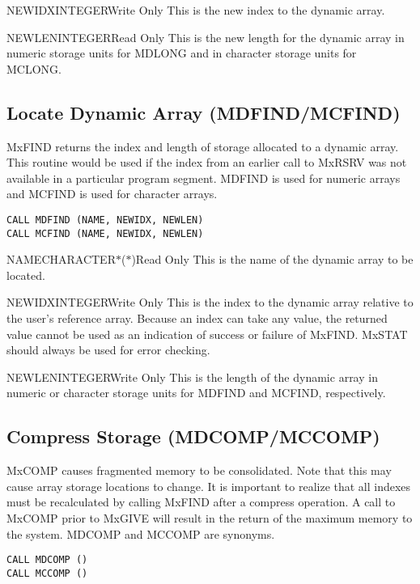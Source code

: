 \begin{argy}{NEWIDX}{INTEGER}{Write Only}
This is the new index to the dynamic array.
\end{argy}

\begin{argy}{NEWLEN}{INTEGER}{Read Only}
This is the new length for the dynamic array in numeric storage units for
MDLONG and in character storage units for MCLONG.
\end{argy}

\subsection{Locate Dynamic Array (MDFIND/MCFIND)}
MxFIND
returns the index and length of storage allocated to a dynamic
array.  This routine would be used if the index from an earlier call to
MxRSRV was not available in a particular program segment. MDFIND
is used for numeric arrays and MCFIND is used for character arrays.
\begin{verbatim}
CALL MDFIND (NAME, NEWIDX, NEWLEN)
CALL MCFIND (NAME, NEWIDX, NEWLEN)
\end{verbatim}

\begin{argy}{NAME}{CHARACTER$*$($*$)}{Read Only}
This is the name of the dynamic array to be located.
\end{argy}

\begin{argy}{NEWIDX}{INTEGER}{Write Only}
This is the index to the dynamic array relative to the user's reference
array. Because an index can take any value, the returned value cannot be
used as an indication of success or failure of MxFIND. MxSTAT should always
be used for error checking.
\end{argy}

\begin{argy}{NEWLEN}{INTEGER}{Write Only}
This is the length of the dynamic array in numeric or character storage
units for MDFIND and MCFIND, respectively.
\end{argy}

\subsection{Compress Storage (MDCOMP/MCCOMP)}
MxCOMP causes fragmented memory to be consolidated.  Note that
this may cause array storage locations to change.  It is important to
realize that all indexes must be recalculated by calling MxFIND
after a compress operation.  A call to MxCOMP prior to
MxGIVE will result in the return of the maximum memory to the system.
MDCOMP and MCCOMP are synonyms.
\begin{verbatim}
CALL MDCOMP ()
CALL MCCOMP ()
\end{verbatim}

